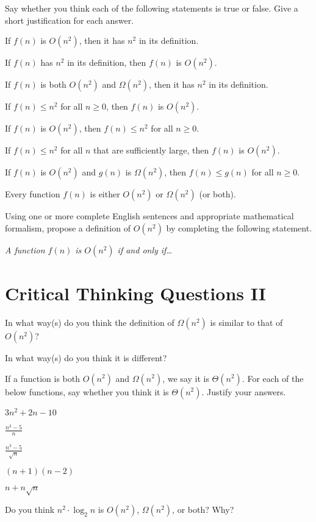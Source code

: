\documentclass{tufte-handout}
\begin{document}
\noindent Say whether you think each of the following statements is
true or false.  Give a short justification for each answer.

\begin{questions}
\item If $f(n)$ is $O(n^2)$, then it has $n^2$ in its definition.
\item If $f(n)$ has $n^2$ in its definition, then $f(n)$ is $O(n^2)$.
\item If $f(n)$ is both $O(n^2)$ and $\Omega(n^2)$, then it has $n^2$
  in its definition.
\item If $f(n) \leq n^2$ for all $n \geq 0$, then $f(n)$ is $O(n^2)$.
\item If $f(n)$ is $O(n^2)$, then $f(n) \leq n^2$ for all $n \geq 0$.
\item If $f(n) \leq n^2$ for all $n$ that are sufficiently large, then
  $f(n)$ is $O(n^2)$.
\item If $f(n)$ is $O(n^2)$ and $g(n)$ is $\Omega(n^2)$, then $f(n)
  \leq g(n)$ for all $n \geq 0$.
\item Every function $f(n)$ is either $O(n^2)$ or $\Omega(n^2)$ (or
  both).
  \newpage
\item Using one or more complete English sentences and appropriate
  mathematical formalism, propose a definition of $O(n^2)$ by
  completing the following statement.

  \emph{A function $f(n)$ is $O(n^2)$ if and only if\dots}
\end{questions}

\pause



\section{Critical Thinking Questions II}

\begin{questions}
\item In what way(s) do you think the definition of $\Omega(n^2)$ is similar to
  that of $O(n^2)$?
\item In what way(s) do you think it is different?
\item If a function is both $O(n^2)$ and $\Omega(n^2)$, we say it is
  $\Theta(n^2)$.  For each of the below functions, say whether you
  think it is $\Theta(n^2)$.  Justify your answers.
  \begin{subquestions}
  \item $3n^2 + 2n - 10$
  \item $\displaystyle \frac{n^3 - 5}{n}$
  \item $\displaystyle \frac{n^3 - 5}{\sqrt n}$
  \item $(n+1)(n-2)$
  \item $n + n \sqrt n$
  \end{subquestions}
\item Do you think $n^2 \cdot \log_2 n$ is $O(n^2)$, $\Omega(n^2)$, or
  both?  Why?
\end{questions}
\end{document}
